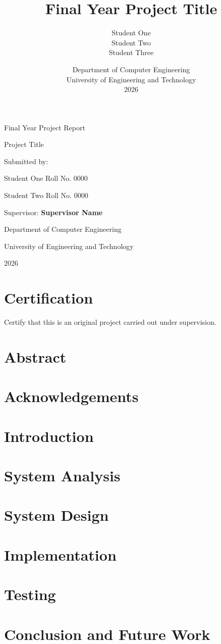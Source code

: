 \documentclass[12pt]{report}
\title{Final Year Project Title}
\author{Student One \\ Student Two \\ Student Three}
\date{Department of Computer Engineering \\ University of Engineering and Technology \\ 2026}
\begin{document}
\begin{titlepage}
  \centering
  {\Huge Final Year Project Report\par}
  \vspace{2cm}
  {\Large Project Title\par}
  \vspace{1.5cm}
  {\large Submitted by:\par}
  Student One \quad Roll No. 0000\par
  Student Two \quad Roll No. 0000\par
  \vspace{1.5cm}
  {\large Supervisor: \textbf{Supervisor Name}\par}
  \vfill
  Department of Computer Engineering\par
  University of Engineering and Technology\par
  2026
\end{titlepage}

\chapter*{Certification}
Certify that this is an original project carried out under supervision.

\chapter*{Abstract}
\chapter*{Acknowledgements}

\tableofcontents
\listoffigures
\listoftables

\chapter{Introduction}
\chapter{System Analysis}
\chapter{System Design}
\chapter{Implementation}
\chapter{Testing}
\chapter{Conclusion and Future Work}



\end{document}
